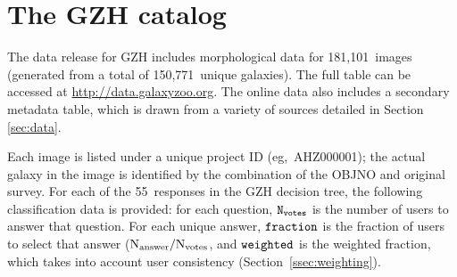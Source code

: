 \documentclass[twocolumn]{aastex6}
\begin{document}
%
%
%
%
%
%
%

\section{The GZH catalog}\label{sec:results}

The data release for GZH includes morphological data for 181,101~images (generated from a total of 150,771~unique galaxies). The full table can be accessed at \url{http://data.galaxyzoo.org}. The online data also includes a secondary metadata table, which is drawn from a variety of sources detailed in Section \ref{sec:data}.

Each image is listed under a unique project ID (eg,~AHZ000001); the actual galaxy in the image is identified by the combination of the OBJNO and original survey. For each of the 55~responses in the GZH decision tree, the following classification data is provided: for each question, $\tt N_{votes}$ is the number of users to answer that question. For each unique answer, $\tt fraction$ is the fraction of users to select that answer ($\rm N_{answer}/N_{votes}$, and $\tt weighted$ is the weighted fraction, which takes into account user consistency (Section~\ref{ssec:weighting}). 
\end{document}
